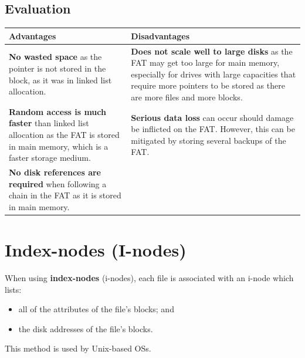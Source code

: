\documentclass[a4paper]{systems-software}
\begin{document}
\subsection*{Evaluation}

\begin{longtabu} to \textwidth {| X[1,l] | X[1,l] |}
    \hline
    \textbf{Advantages} & \textbf{Disadvantages}
	\\ \hline
	\textbf{No wasted space} as the pointer is not stored in the block, as it was in linked list allocation. &
	\textbf{Does not scale well to large disks} as the FAT may get too large for main memory, especially for drives with large capacities that require more pointers to be stored as there are more files and more blocks.
	\\ \hline
	\textbf{Random access is much faster} than linked list allocation as the FAT is stored in main memory, which is a faster storage medium. &
	\textbf{Serious data loss} can occur should damage be inflicted on the FAT. However, this can be mitigated by storing several backups of the FAT.
	\\ \hline
	\textbf{No disk references are required} when following a chain in the FAT as it is stored in main memory. &
	\\ \hline
\end{longtabu}


\section*{Index-nodes (I-nodes)}

When using \textbf{index-nodes} (i-nodes), each file is associated with an i-node which lists:
\begin{itemize}
	\item all of the attributes of the file's blocks; and
	\item the disk addresses of the file's blocks.
\end{itemize}

This method is used by Unix-based OSs.
\end{document}
